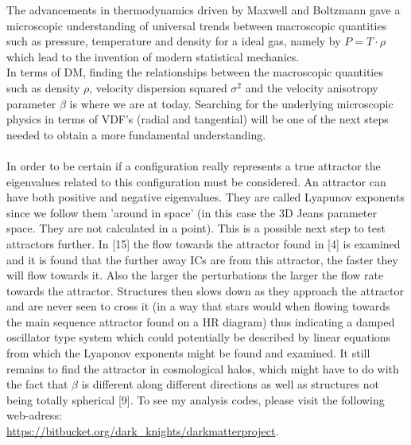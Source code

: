 The advancements in thermodynamics driven by Maxwell and Boltzmann gave a microscopic understanding of universal trends between macroscopic quantities such as pressure, temperature and density for a ideal gas, 
namely by $P = T \cdot \rho$ which lead to the invention of modern statistical mechanics. \\
In terms of DM, finding the relationships between the macroscopic quantities such as density $\rho$, velocity dispersion squared $\sigma^2$ and the velocity anisotropy parameter $\beta$ is where we are at today. Searching for the underlying microscopic physics in terms of VDF's (radial and tangential) will be one of the next steps needed to obtain a more fundamental understanding. \\ \\
In order to be certain if a configuration really represents a true attractor the eigenvalues related to this configuration must be considered. An attractor can have both positive and negative eigenvalues. They are called Lyapunov exponents since we follow them 'around in space' (in this case the 3D Jeans parameter space. They are not calculated in a point). This is a possible next step to test attractors further. In [15] the flow towards the attractor found in [4] is examined and it is found that the further away ICs are from this attractor, the faster they will flow towards it. Also the larger the perturbations the larger the flow rate towards the attractor. Structures then slows down as they approach the attractor and are never seen to cross it (in a way that stars would when flowing towards the main sequence attractor found on a HR diagram) thus indicating a damped oscillator type system which could potentially be described by linear equations from which the Lyaponov exponents might be found and examined. It still remains to find the attractor in cosmological halos, which might have to do with the fact that $\beta$ is different along different directions as well as structures not being totally spherical [9]. To see my analysis codes, please visit the following web-adress: \\
\url{https://bitbucket.org/dark_knights/darkmatterproject}.